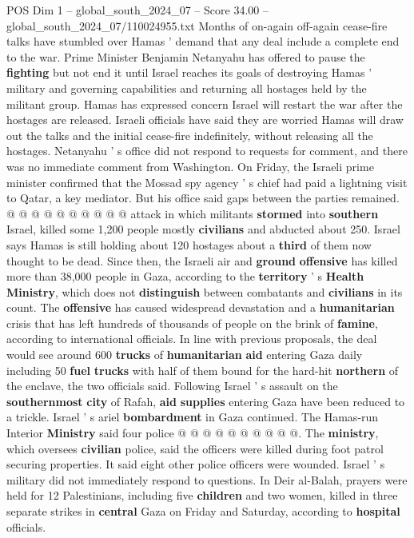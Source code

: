 \begin{textsample}{POS Dim 1 – global\_south\_2024\_07 – Score 34.00 – global\_south\_2024\_07/110024955.txt}
Months of on-again off-again cease-fire talks have stumbled over Hamas ' demand that any deal include a complete end to the war.
Prime Minister Benjamin Netanyahu has offered to pause the \textbf{fighting} but not end it until Israel reaches its goals of destroying Hamas ' military and governing capabilities and returning all hostages held by the militant group.
Hamas has expressed concern Israel will restart the war after the hostages are released.
Israeli officials have said they are worried Hamas will draw out the talks and the initial cease-fire indefinitely, without releasing all the hostages.
Netanyahu ' s office did not respond to requests for comment, and there was no immediate comment from Washington.
On Friday, the Israeli prime minister confirmed that the Mossad spy agency ' s chief had paid a lightning visit to Qatar, a key mediator.
But his office said gaps between the parties remained. @ @ @ @ @ @ @ @ @ @ attack in which militants \textbf{stormed} into \textbf{southern} Israel, killed some 1,200 people mostly \textbf{civilians} and abducted about 250.
Israel says Hamas is still holding about 120 hostages about a \textbf{third} of them now thought to be dead.
Since then, the Israeli air and \textbf{ground} \textbf{offensive} has killed more than 38,000 people in Gaza, according to the \textbf{territory} ' s \textbf{Health} \textbf{Ministry}, which does not \textbf{distinguish} between combatants and \textbf{civilians} in its count.
The \textbf{offensive} has caused widespread devastation and a \textbf{humanitarian} crisis that has left hundreds of thousands of people on the brink of \textbf{famine}, according to international officials.
In line with previous proposals, the deal would see around 600 \textbf{trucks} of \textbf{humanitarian} \textbf{aid} entering Gaza daily including 50 \textbf{fuel} \textbf{trucks} with half of them bound for the hard-hit \textbf{northern} of the enclave, the two officials said.
Following Israel ' s assault on the \textbf{southernmost} \textbf{city} of Rafah, \textbf{aid} \textbf{supplies} entering Gaza have been reduced to a trickle.
Israel ' s ariel \textbf{bombardment} in Gaza continued.
The Hamas-run Interior \textbf{Ministry} said four police @ @ @ @ @ @ @ @ @ @.
The \textbf{ministry}, which oversees \textbf{civilian} police, said the officers were killed during foot patrol securing properties.
It said eight other police officers were wounded.
Israel ' s military did not immediately respond to questions.
In Deir al-Balah, prayers were held for 12 Palestinians, including five \textbf{children} and two women, killed in three separate strikes in \textbf{central} Gaza on Friday and Saturday, according to \textbf{hospital} officials.

\end{textsample}
